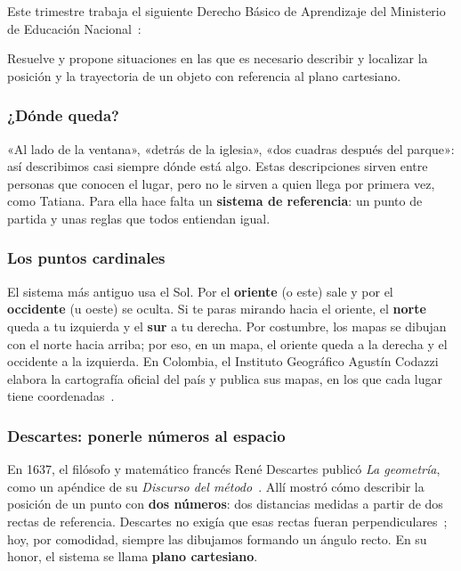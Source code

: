 \documentclass[11pt]{article}
\begin{document}
Este trimestre trabaja el siguiente Derecho Básico de Aprendizaje del Ministerio de Educación
Nacional~\cite{mendba}:

\begin{dba}
Resuelve y propone situaciones en las que es necesario describir y localizar la posición y la
trayectoria de un objeto con referencia al plano cartesiano.
\end{dba}


\subsubsection*{¿Dónde queda?}

«Al lado de la ventana», «detrás de la iglesia», «dos cuadras después del parque»: así
describimos casi siempre dónde está algo. Estas descripciones sirven entre personas que conocen
el lugar, pero no le sirven a quien llega por primera vez, como Tatiana. Para ella hace falta un
\textbf{sistema de referencia}: un punto de partida y unas reglas que todos entiendan igual.

\subsubsection*{Los puntos cardinales}

El sistema más antiguo usa el Sol. Por el \textbf{oriente} (o este) sale y por el
\textbf{occidente} (u oeste) se oculta. Si te paras mirando hacia el oriente, el
\textbf{norte} queda a tu izquierda y el \textbf{sur} a tu derecha. Por costumbre, los mapas se
dibujan con el norte hacia arriba; por eso, en un mapa, el oriente queda a la derecha y el
occidente a la izquierda. En Colombia, el Instituto Geográfico Agustín Codazzi elabora la
cartografía oficial del país y publica sus mapas, en los que cada lugar tiene
coordenadas~\cite{igac}.

\subsubsection*{Descartes: ponerle números al espacio}

En 1637, el filósofo y matemático francés René Descartes publicó \emph{La geometría}, como un
apéndice de su \emph{Discurso del método}~\cite{descartes1637}. Allí mostró cómo describir la
posición de un punto con \textbf{dos números}: dos distancias medidas a partir de dos rectas de
referencia. Descartes no exigía que esas rectas fueran perpendiculares~\cite{sepdescartes}; hoy,
por comodidad, siempre las dibujamos formando un ángulo recto. En su honor, el sistema se llama
\textbf{plano cartesiano}.
\end{document}
